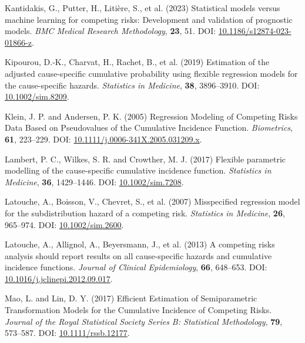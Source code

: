 \documentclass[
  letterpaper,
  DIV=11,
  numbers=noendperiod]{scrreprt}
\newlength{\cslhangindent}
\newlength{\cslentryspacingunit} %
\newenvironment{CSLReferences}[2] %
 {%
  \setlength{\parindent}{0pt}
  \ifodd #1
  \let\oldpar\par
  \def\par{\hangindent=\cslhangindent\oldpar}
  \fi
  \setlength{\parskip}{#2\cslentryspacingunit}
 }%
 {}
\begin{document}
\begin{CSLReferences}{1}{0}
\leavevmode{}%
Kantidakis, G., Putter, H., Litière, S., et al. (2023) Statistical
models versus machine learning for competing risks: Development and
validation of prognostic models. \emph{BMC Medical Research
Methodology}, \textbf{23}, 51. DOI:
\href{https://doi.org/10.1186/s12874-023-01866-z}{10.1186/s12874-023-01866-z}.

\leavevmode{}%
Kipourou, D.-K., Charvat, H., Rachet, B., et al. (2019) Estimation of
the adjusted cause-specific cumulative probability using flexible
regression models for the cause-specific hazards. \emph{Statistics in
Medicine}, \textbf{38}, 3896--3910. DOI:
\href{https://doi.org/10.1002/sim.8209}{10.1002/sim.8209}.

\leavevmode{}%
Klein, J. P. and Andersen, P. K. (2005) Regression {Modeling} of
{Competing Risks Data Based} on {Pseudovalues} of the {Cumulative
Incidence Function}. \emph{Biometrics}, \textbf{61}, 223--229. DOI:
\href{https://doi.org/10.1111/j.0006-341X.2005.031209.x}{10.1111/j.0006-341X.2005.031209.x}.

\leavevmode{}%
Lambert, P. C., Wilkes, S. R. and Crowther, M. J. (2017) Flexible
parametric modelling of the cause-specific cumulative incidence
function. \emph{Statistics in Medicine}, \textbf{36}, 1429--1446. DOI:
\href{https://doi.org/10.1002/sim.7208}{10.1002/sim.7208}.

\leavevmode{}%
Latouche, A., Boisson, V., Chevret, S., et al. (2007) Misspecified
regression model for the subdistribution hazard of a competing risk.
\emph{Statistics in Medicine}, \textbf{26}, 965--974. DOI:
\href{https://doi.org/10.1002/sim.2600}{10.1002/sim.2600}.

\leavevmode{}%
Latouche, A., Allignol, A., Beyersmann, J., et al. (2013) A competing
risks analysis should report results on all cause-specific hazards and
cumulative incidence functions. \emph{Journal of Clinical Epidemiology},
\textbf{66}, 648--653. DOI:
\href{https://doi.org/10.1016/j.jclinepi.2012.09.017}{10.1016/j.jclinepi.2012.09.017}.

\leavevmode{}%
Mao, L. and Lin, D. Y. (2017) Efficient {Estimation} of {Semiparametric
Transformation Models} for the {Cumulative Incidence} of {Competing
Risks}. \emph{Journal of the Royal Statistical Society Series B:
Statistical Methodology}, \textbf{79}, 573--587. DOI:
\href{https://doi.org/10.1111/rssb.12177}{10.1111/rssb.12177}.


\end{CSLReferences}
\end{document}
